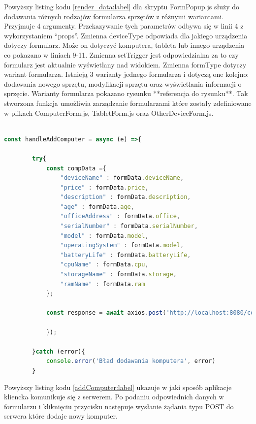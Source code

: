 Powyższy listing kodu \ref{render_data:label} dla skryptu FormPopup.js  służy do dodawania różnych rodzajów formularza sprzętów z różnymi wariantami. Przyjmuje 4 argumenty. Przekazywanie tych parametrów odbywa się w linii 4 z wykorzystaniem "`props"'. Zmienna deviceType odpowiada dla jakiego urządzenia dotyczy formularz. Może on dotyczyć komputera, tableta lub innego urządzenia co pokazano w liniach 9-11. Zmienna setTrigger jest odpowiedzialna za to czy formularz jest aktualnie wyświetlany nad widokiem. Zmienna formType dotyczy wariant formularza. Istnieją 3 warianty jednego formularza i dotyczą one kolejno: dodawania nowego sprzętu, modyfikacji sprzętu oraz wyświetlania informacji o sprzęcie. Warianty formularza pokazano rysunku **referencja do rysunku**. Tak stworzona funkcja umożliwia zarządzanie formularzami które zostały zdefiniowane w plikach ComputerForm.js, TabletForm.js oraz OtherDeviceForm.js.

\begin{lstlisting}[language=JavaScript, style=JavaScriptStyle,  caption={Przykładowe zapytanie do serwera dla formularza komputera}, label={addComputer:label}]

const handleAddComputer = async (e) =>{

        try{
            const compData ={
                "deviceName" : formData.deviceName,
                "price" : formData.price,
                "description" : formData.description,
                "age" : formData.age,
                "officeAddress" : formData.office,
                "serialNumber" : formData.serialNumber,
                "model" : formData.model,
                "operatingSystem" : formData.model,
                "batteryLife" : formData.batteryLife,
                "cpuName" : formData.cpu,
                "storageName" : formData.storage,
                "ramName" : formData.ram
            };

            const response = await axios.post('http://localhost:8080/computers/add', compData, {

            });

        }catch (error){
            console.error('Bład dodawania komputera', error)
        }

\end{lstlisting}

Powyższy listing kodu \ref{addComputer:label} ukazuje w jaki sposób aplikacje kliencka komunikuje się z serwerem. Po podaniu odpowiednich danych w formularzu i kliknięciu przycisku następuje wysłanie żądania typu POST do serwera które dodaje nowy komputer. 

